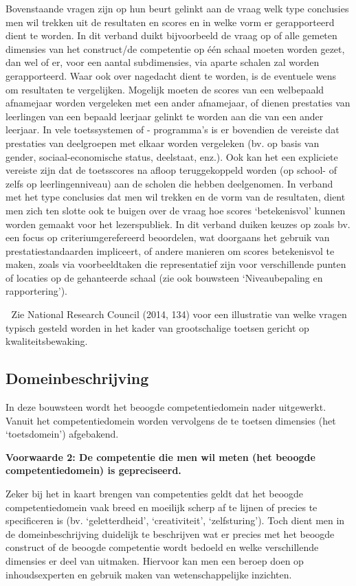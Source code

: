 \documentclass[
  letterpaper,
]{report}
\begin{document}
Bovenstaande vragen zijn op hun beurt gelinkt aan de vraag welk type
conclusies men wil trekken uit de resultaten en scores en in welke vorm
er gerapporteerd dient te worden. In dit verband duikt bijvoorbeeld de
vraag op of alle gemeten dimensies van het construct/de competentie op
één schaal moeten worden gezet, dan wel of er, voor een aantal
subdimensies, via aparte schalen zal worden gerapporteerd. Waar ook over
nagedacht dient te worden, is de eventuele wens om resultaten te
vergelijken. Mogelijk moeten de scores van een welbepaald afnamejaar
worden vergeleken met een ander afnamejaar, of dienen prestaties van
leerlingen van een bepaald leerjaar gelinkt te worden aan die van een
ander leerjaar. In vele toetssystemen of - programma's is er bovendien
de vereiste dat prestaties van deelgroepen met elkaar worden vergeleken
(bv. op basis van gender, sociaal-economische status, deelstaat, enz.).
Ook kan het een expliciete vereiste zijn dat de toetsscores na afloop
teruggekoppeld worden (op school- of zelfs op leerlingenniveau) aan de
scholen die hebben deelgenomen. In verband met het type conclusies dat
men wil trekken en de vorm van de resultaten, dient men zich ten slotte
ook te buigen over de vraag hoe scores `betekenisvol' kunnen worden
gemaakt voor het lezerspubliek. In dit verband duiken keuzes op zoals
bv. een focus op criteriumgerefereerd beoordelen, wat doorgaans het
gebruik van prestatiestandaarden impliceert, of andere manieren om
scores betekenisvol te maken, zoals via voorbeeldtaken die
representatief zijn voor verschillende punten of locaties op de
gehanteerde schaal (zie ook bouwsteen `Niveaubepaling en rapportering').

📖 Zie National Research Council (2014, 134) voor een illustratie van
welke vragen typisch gesteld worden in het kader van grootschalige
toetsen gericht op kwaliteitsbewaking.

\hypertarget{domeinbeschrijving}{%
\subsection{Domeinbeschrijving}\label{domeinbeschrijving}}

In deze bouwsteen wordt het beoogde competentiedomein nader uitgewerkt.
Vanuit het competentiedomein worden vervolgens de te toetsen dimensies
(het `toetsdomein') afgebakend.

\textbf{Voorwaarde 2: De competentie die men wil meten (het beoogde
competentiedomein) is gepreciseerd.}

Zeker bij het in kaart brengen van competenties geldt dat het beoogde
competentiedomein vaak breed en moeilijk scherp af te lijnen of precies
te specificeren is (bv. `geletterdheid', `creativiteit', `zelfsturing').
Toch dient men in de domeinbeschrijving duidelijk te beschrijven wat er
precies met het beoogde construct of de beoogde competentie wordt
bedoeld en welke verschillende dimensies er deel van uitmaken. Hiervoor
kan men een beroep doen op inhoudsexperten en gebruik maken van
wetenschappelijke inzichten.
\end{document}
